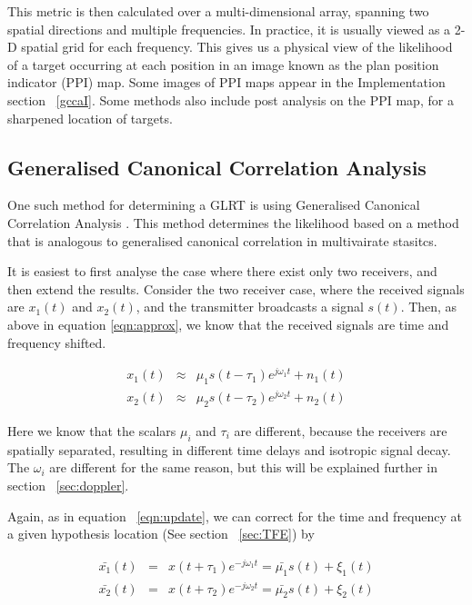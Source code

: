 \documentclass[12pt,openany,a4paper]{book}
\begin{document}
This metric is then calculated over a multi-dimensional array, spanning two spatial directions and multiple frequencies. In practice, it is usually viewed as a 2-D spatial grid for each frequency. This gives us a physical view of the likelihood of a target occurring at each position in an image known as the plan position indicator (PPI) map. Some images of PPI maps appear in the Implementation section ~\ref{gccaI}. Some methods also include post analysis on the PPI map, for a sharpened location of targets.

\subsection{Generalised Canonical Correlation Analysis}
One such method for determining a GLRT is using Generalised Canonical Correlation Analysis \cite{gcc}.
This method determines the likelihood based on a method that is analogous to generalised canonical correlation in multivairate stasitcs. 

\bigskip

It is easiest to first analyse the case where there exist only two receivers, and then extend the results. Consider the two receiver case, where the received signals are $x_{1}(t)$ and $x_{2}(t)$, and the transmitter broadcasts a signal $s(t)$. Then, as above in equation \ref{eqn:approx}, we know that the received signals are time and frequency shifted.

\begin{eqnarray}
x_1(t) & \approx & \mu_1 s(t-\tau_1) e^{j\omega_1 t} + n_1(t) \\
x_2(t) & \approx & \mu_2 s(t-\tau_2) e^{j\omega_2 t} + n_2(t)
\end{eqnarray}

Here we know that the scalars $\mu_i$ and $\tau_i$ are different, because the receivers are spatially separated, resulting in different time delays and isotropic signal decay. The $\omega_i$ are different for the same reason, but this will be explained further in section ~\ref{sec:doppler}.

\bigskip

Again, as in equation ~\ref{eqn:update}, we can correct for the time and frequency at a given hypothesis location (See section ~\ref{sec:TFE}) by

\begin{eqnarray}
\bar{x_1}(t) & = & x(t+\tau_1) e^{-j\omega_1 t} = \bar{\mu_1} s(t) + \xi_1(t) \\
\bar{x_2}(t) & = & x(t+\tau_2) e^{-j\omega_2 t} = \bar{\mu_2} s(t) + \xi_2(t)
\end{eqnarray}
\end{document}
